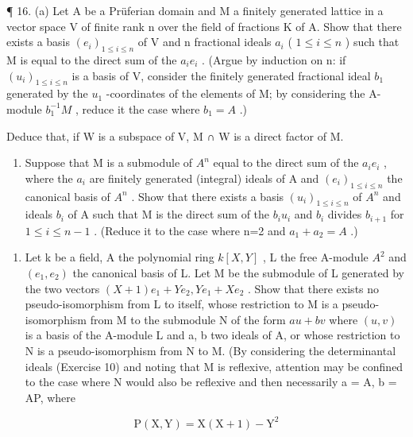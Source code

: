 ¶ 16. (a) Let A be a Prüferian domain and M a finitely generated lattice in a vector space V of finite rank n over the field of fractions K of A. Show that there exists a basis \((e_{i})_{1 \leqslant i \leqslant n}\) of V and n fractional ideals \(a_{i}\) ( \(1 \leqslant i \leqslant n\) ) such that M is equal to the direct sum of the \(a_{i}e_{i}\) . (Argue by induction on n: if \((u_{i})_{1\leq i\leq n}\) is a basis of V, consider the finitely generated fractional ideal \(b_{1}\) generated by the \(u_{1}\) -coordinates of the elements of M; by considering the A-module \(b_{1}^{-1}M\) , reduce it the case where \(b_{1}=A\) .)

Deduce that, if W is a subspace of V, M ∩ W is a direct factor of M.

\begin{enumerate}
\def\labelenumi{(\alph{enumi})}
\setcounter{enumi}{1}
\tightlist
\item
  Suppose that M is a submodule of \(A^{n}\) equal to the direct sum of the \(a_{i}e_{i}\) , where the \(a_{i}\) are finitely generated (integral) ideals of A and \((e_{i})_{1\leqslant i\leqslant n}\) the canonical basis of \(A^{n}\) . Show that there exists a basis \((u_{i})_{1\leqslant i\leqslant n}\) of \(A^{n}\) and ideals \(b_{i}\) of A such that M is the direct sum of the \(b_{i}u_{i}\) and \(b_{i}\) divides \(b_{i+1}\) for \(1\leqslant i\leqslant n-1\) . (Reduce it to the case where n=2 and \(a_{1}+a_{2}=A\) .)
\end{enumerate}

\begin{enumerate}
\def\labelenumi{\arabic{enumi}.}
\setcounter{enumi}{16}
\tightlist
\item
  Let k be a field, A the polynomial ring \(k[X, Y]\) , L the free A-module \(A^{2}\) and \((e_{1}, e_{2})\) the canonical basis of L. Let M be the submodule of L generated by the two vectors \((X + 1)e_{1} + Ye_{2}, Ye_{1} + Xe_{2}\) . Show that there exists no pseudo-isomorphism from L to itself, whose restriction to M is a pseudo-isomorphism from M to the submodule N of the form \(au + bv\) where \((u, v)\) is a basis of the A-module L and a, b two ideals of A, or whose restriction to N is a pseudo-isomorphism from N to M. (By considering the determinantal ideals (Exercise 10) and noting that M is reflexive, attention may be confined to the case where N would also be reflexive and then necessarily a = A, b = AP, where
\end{enumerate}

\[
\mathrm{P} (\mathrm{X}, \mathrm{Y}) = \mathrm{X} (\mathrm{X} + 1) - \mathrm{Y} ^ {2}
\]

